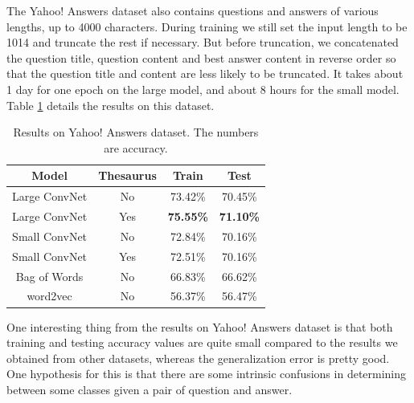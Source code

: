 \documentclass{article}
\begin{document}
\begin{CJK}{UTF8}{gbsn}
The Yahoo! Answers dataset also contains questions and answers of various lengths, up to 4000 characters. During training we still set the input length to be 1014 and truncate the rest if necessary. But before truncation, we concatenated the question title, question content and best answer content in reverse order so that the question title and content are less likely to be truncated. It takes about 1 day for one epoch on the large model, and about 8 hours for the small model. Table \ref{tab:yadr} details the results on this dataset.

\begin{table}[ht]
  \caption{Results on Yahoo! Answers dataset. The numbers are accuracy.}
  \label{tab:yadr}
  \begin{center}
    \begin{tabular}{cccc}
      \hline
      \abovespace\belowspace
      Model & Thesaurus & Train & Test  \\
      \hline
      \abovespace
      Large ConvNet & No & 73.42\% & 70.45\% \\
      Large ConvNet & Yes & \textbf{75.55\%} & \textbf{71.10\%} \\
      Small ConvNet & No & 72.84\% & 70.16\% \\
      Small ConvNet & Yes & 72.51\% & 70.16\% \\
      Bag of Words & No & 66.83\% & 66.62\% \\
      \belowspace
      word2vec & No & 56.37\% & 56.47\% \\
      \hline
    \end{tabular}
  \end{center}
\end{table}

One interesting thing from the results on Yahoo! Answers dataset is that both training and testing accuracy values are quite small compared to the results we obtained from other datasets, whereas the generalization error is pretty good. One hypothesis for this is that there are some intrinsic confusions in determining between some classes given a pair of question and answer.


\end{CJK}
\end{document}
